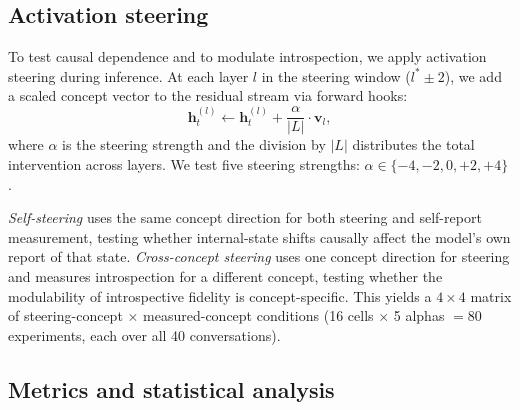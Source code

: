 \documentclass[10pt]{article}
\begin{document}
\subsection{Activation steering}
\label{sec:methods-steering}

To test causal dependence and to modulate introspection, we apply activation steering during inference.
At each layer $l$ in the steering window ($l^* \pm 2$), we add a scaled concept vector to the residual stream via forward hooks:
\begin{equation}
  \label{eq:steering}
  \mathbf{h}_t^{(l)} \leftarrow \mathbf{h}_t^{(l)} + \frac{\alpha}{|L|} \cdot \mathbf{v}_l,
\end{equation}
where $\alpha$ is the steering strength and the division by $|L|$ distributes the total intervention across layers.
We test five steering strengths: $\alpha \in \{-4, -2, 0, +2, +4\}$.

\emph{Self-steering} uses the same concept direction for both steering and self-report measurement, testing whether internal-state shifts causally affect the model's own report of that state.
\emph{Cross-concept steering} uses one concept direction for steering and measures introspection for a different concept, testing whether the modulability of introspective fidelity is concept-specific.
This yields a $4 \times 4$ matrix of steering-concept $\times$ measured-concept conditions (16 cells $\times$ 5 alphas $= 80$ experiments, each over all 40 conversations).

\subsection{Metrics and statistical analysis}
\label{sec:methods-stats}
\end{document}
